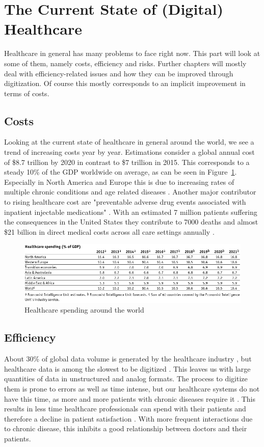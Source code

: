 \section{The Current State of (Digital) Healthcare}
Healthcare in general has many problems to face right now. This part will look at some of them, namely costs, efficiency and risks. Further chapters will mostly deal with efficiency-related issues and how they can be improved through digitization. Of course this mostly corresponds to an implicit improvement in terms of costs.
\subsection{Costs}
Looking at the current state of healthcare in general around the world, we see a trend of increasing costs year by year. Estimations consider a global annual cost of \$8.7 trillion by 2020 in contrast to \$7 trillion in 2015. This corresponds to a steady 10\% of the GDP worldwide on average, as can be seen in Figure~\ref{fig:GDPSpendingHC}.
Especially in North America and Europe this is due to increasing rates of multiple chronic conditions and age related diseases \cite{sambamoorthi2015multiple}. Another major contributor to rising healthcare cost are "preventable adverse drug events associated with inpatient injectable medications" \cite{lahue2012national}. With an estimated 7 million patients suffering the consequences in the United States they contribute to 7000 deaths and almost \$21 billion in direct medical costs across all care settings annually \cite{prevMedErrors}.
\begin{figure}[htpb]
    \centering
    \includegraphics[width=\linewidth]{media/Screenshot_2020-01-09_01_FULL_REPORT-World_healthcare_and.png}
    \caption{Healthcare spending around the world \cite{EIU2016}}%
    \label{fig:GDPSpendingHC}
\end{figure}
\subsection{Efficiency}
About 30\% of global data volume is generated by the healthcare industry \cite{gopal2019digital}, but healthcare data is among the slowest to be digitized \cite{industryDigitalization}. This leaves us with large quantities of data in unstructured and analog formats. The process to digitize them is prone to errors as well as time intense, but our healthcare systems do not have this time, as more and more patients with chronic diseases require it \cite{ostbye2005there}. This results in less time healthcare professionals can spend with their patients \cite{fuchtbauer2013emergency} and therefore a decline in patient satisfaction \cite{gross1998patient}. With more frequent interactions due to chronic disease, this inhibits a good relationship between doctors and their patients.
